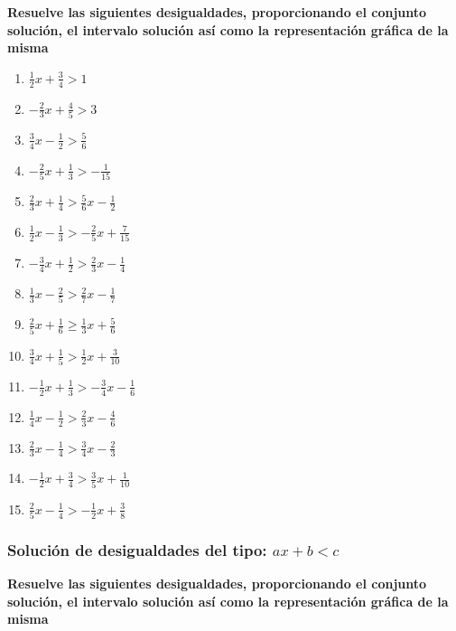 \documentclass[12pt]{article}
\begin{document}
\textbf{Resuelve las siguientes desigualdades, proporcionando el
conjunto solución, el intervalo solución así como la representación
gráfica de la misma}

\begin{enumerate}
\def\labelenumi{\arabic{enumi}.}
\item
  \(\frac{1}{2}x+\frac{3}{4}>1\)
\item
  \(-\frac{2}{3}x+\frac{4}{5}>3\)
\item
  \(\frac{3}{4}x-\frac{1}{2}>\frac{5}{6}\)
\item
  \(-\frac{2}{5}x+\frac{1}{3}>-\frac{1}{15}\)
\item
  \(\frac{2}{3}x+\frac{1}{4}>\frac{5}{6}x-\frac{1}{2}\)
\item
  \(\frac{1}{2}x-\frac{1}{3}>-\frac{2}{5}x+\frac{7}{15}\)
\item
  \(-\frac{3}{4}x+\frac{1}{2}>\frac{2}{3}x-\frac{1}{4}\)
\item
  \(\frac{1}{3}x-\frac{2}{5}>\frac{2}{7}x-\frac{1}{7}\)
\item
  \(\frac{2}{5}x+\frac{1}{6}\geq\frac{1}{3}x+\frac{5}{6}\)
\item
  \(\frac{3}{4}x+\frac{1}{5}>\frac{1}{2}x+\frac{3}{10}\)
\item
  \(-\frac{1}{2}x+\frac{1}{3}>-\frac{3}{4}x-\frac{1}{6}\)
\item
  \(\frac{1}{4}x-\frac{1}{2}>\frac{2}{3}x-\frac{4}{6}\)
\item
  \(\frac{2}{3}x-\frac{1}{4}>\frac{3}{4}x-\frac{2}{3}\)
\item
  \(-\frac{1}{2}x+\frac{3}{4}>\frac{3}{5}x+\frac{1}{10}\)
\item
  \(\frac{2}{5}x-\frac{1}{4}>-\frac{1}{2}x+\frac{3}{8}\)
\end{enumerate}

\subsubsection{\texorpdfstring{Solución de desigualdades del tipo:
\(ax+b<c\)}{Solución de desigualdades del tipo: ax+b\textless c}}\label{soluciuxf3n-de-desigualdades-del-tipo-axbc-1}

\textbf{Resuelve las siguientes desigualdades, proporcionando el
conjunto solución, el intervalo solución así como la representación
gráfica de la misma}
\end{document}
